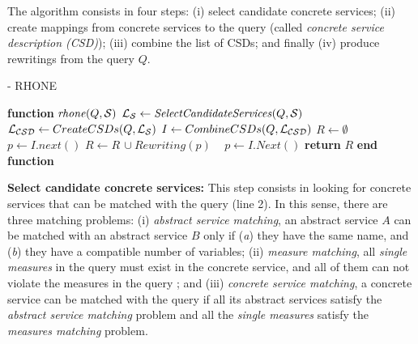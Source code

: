 The algorithm consists in four steps: (i) select candidate concrete services; (ii)
create mappings from concrete services to the query (called \textit{concrete
service description (CSD)}); (iii) combine the list of CSDs; and finally (iv)
produce rewritings from the query $Q$.


\begin{algorithm}
\tiny
\caption{ - RHONE}
\label{algo-rhone}

\begin{algorithmic}[1]
 
\STATE \textbf{function} $\mathit{rhone} (Q, \bigS)$
 \STATE  $\bigLS \leftarrow \mathit{SelectCandidateServices}(Q, \bigS)$ \label{rhone:buildPCD}
 \STATE  $\bigLCSD \leftarrow CreateCSDs(Q, \bigLS)$
 \STATE  $I \leftarrow CombineCSDs(Q, \bigLCSD)$
 \STATE $R\leftarrow \emptyset$
    \STATE $p \leftarrow I.next()$
  \STATE $R\leftarrow R\,\cup \mathit{Rewriting}(p)$
  \STATE ~\!
   \ENDIF
      \STATE $p \leftarrow I.\mathit{Next}()$
 \ENDWHILE
    \STATE \textbf{return} $R$
\STATE \textbf{end function}

\end{algorithmic}

\end{algorithm}


\noindent \textbf{Select candidate concrete services:} This step consists in
 looking for concrete services that can be matched with the query (line 2). In
 this sense, there are three matching problems: 
 (i) \textit{abstract service matching}, an abstract service $A$ can be
 matched with an abstract service $B$ only if (\textit{a}) they have the same
 name, and (\textit{b}) they have a compatible number of variables;
 (ii) \textit{measure matching}, all \textit{single measures} in the query must
 exist in the concrete service, and all of them can not violate the measures in
 the query ; and 
 (iii) \textit{concrete service matching}, a concrete service can
 be matched with the query if all its abstract services satisfy the \textit{abstract service
 matching} problem and all the \textit{single measures} satisfy the \textit{measures matching} problem.
 

